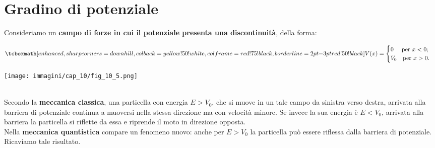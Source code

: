 \section{Gradino di potenziale}
Consideriamo un \textbf{campo di forze in cui il potenziale presenta una discontinuità}, della forma:\\
\begin{minipage}{.55\textwidth}
	\begin{equation}
		\tcboxmath[enhanced, sharp corners=downhill, colback=yellow!50!white, colframe=red!75!black, borderline={2pt}{-3pt}{red!50!black}]{
			V(x)=
			\begin{cases}
			0 \quad \textrm{ per } x<0;\\
			V_0 \quad \textrm{per } x>0.
			\end{cases}
			}
	\end{equation}
\end{minipage}
\hspace{.2cm}
\begin{minipage}{.4\textwidth}
\texttt{[image: immagini/cap\_10/fig\_10\_5.png]}
\end{minipage}\\

Secondo la \textbf{meccanica classica}, una particella con energia $E>V_0$, che si muove in un tale campo da sinistra verso destra, arrivata alla barriera di potenziale continua a muoversi nella stessa direzione ma con velocità minore. Se invece la sua energia è $E<V_0$, arrivata alla barriera la particella si riflette da essa e riprende il moto in direzione opposta.\\

Nella \textbf{meccanica quantistica} compare un fenomeno nuovo: anche per $E>V_0$ la particella può essere riflessa dalla barriera di potenziale. Ricaviamo tale risultato.\\

